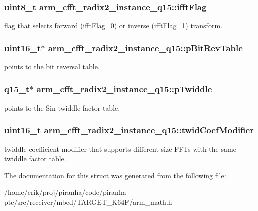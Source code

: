 \subsubsection[{\texorpdfstring{ifft\+Flag}{ifftFlag}}]{\setlength{\rightskip}{0pt plus 5cm}uint8\+\_\+t arm\+\_\+cfft\+\_\+radix2\+\_\+instance\+\_\+q15\+::ifft\+Flag}\hypertarget{structarm__cfft__radix2__instance__q15_ab5c073286bdd2f6e2bf783ced36bf1de}{}\label{structarm__cfft__radix2__instance__q15_ab5c073286bdd2f6e2bf783ced36bf1de}
flag that selects forward (ifft\+Flag=0) or inverse (ifft\+Flag=1) transform. 
\subsubsection[{\texorpdfstring{p\+Bit\+Rev\+Table}{pBitRevTable}}]{\setlength{\rightskip}{0pt plus 5cm}uint16\+\_\+t$\ast$ arm\+\_\+cfft\+\_\+radix2\+\_\+instance\+\_\+q15\+::p\+Bit\+Rev\+Table}\hypertarget{structarm__cfft__radix2__instance__q15_ab88afeff6493be3c8b5e4530efa82d51}{}\label{structarm__cfft__radix2__instance__q15_ab88afeff6493be3c8b5e4530efa82d51}
points to the bit reversal table. 
\subsubsection[{\texorpdfstring{p\+Twiddle}{pTwiddle}}]{\setlength{\rightskip}{0pt plus 5cm}q15\+\_\+t$\ast$ arm\+\_\+cfft\+\_\+radix2\+\_\+instance\+\_\+q15\+::p\+Twiddle}\hypertarget{structarm__cfft__radix2__instance__q15_a3809dd15e7cbf1a054c728cfbbb0cc5a}{}\label{structarm__cfft__radix2__instance__q15_a3809dd15e7cbf1a054c728cfbbb0cc5a}
points to the Sin twiddle factor table. 
\subsubsection[{\texorpdfstring{twid\+Coef\+Modifier}{twidCoefModifier}}]{\setlength{\rightskip}{0pt plus 5cm}uint16\+\_\+t arm\+\_\+cfft\+\_\+radix2\+\_\+instance\+\_\+q15\+::twid\+Coef\+Modifier}\hypertarget{structarm__cfft__radix2__instance__q15_a6f2ab87fb4c568656e1f92f687b5c850}{}\label{structarm__cfft__radix2__instance__q15_a6f2ab87fb4c568656e1f92f687b5c850}
twiddle coefficient modifier that supports different size F\+F\+Ts with the same twiddle factor table. 

The documentation for this struct was generated from the following file\+:\begin{DoxyCompactItemize}
\item 
/home/erik/proj/piranha/code/piranha-\/ptc/src/receiver/mbed/\+T\+A\+R\+G\+E\+T\+\_\+\+K64\+F/arm\+\_\+math.\+h\end{DoxyCompactItemize}
